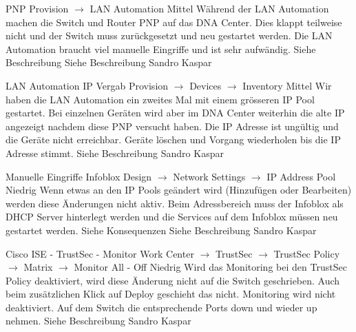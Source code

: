 \bugreport
{PNP}
{Provision $\rightarrow$ LAN Automation}
{Mittel}
{Während der LAN Automation machen die Switch und Router PNP auf das DNA Center. Dies klappt teilweise nicht und der Switch muss zurückgesetzt und neu gestartet werden.}
{Die LAN Automation braucht viel manuelle Eingriffe und ist sehr aufwändig.}
{Siehe Beschreibung}
{
	Siehe Beschreibung
}
{Sandro Kaspar}
{}


\bugreport
{LAN Automation IP Vergab}
{Provision $\rightarrow$ Devices $\rightarrow$ Inventory}
{Mittel}
{Wir haben die LAN Automation ein zweites Mal mit einem grösseren IP Pool gestartet. Bei einzelnen Geräten wird aber im DNA Center weiterhin die alte IP angezeigt nachdem diese PNP versucht haben.}
{Die IP Adresse ist ungültig und die Geräte nicht erreichbar.}
{Geräte löschen und Vorgang wiederholen bis die IP Adresse stimmt.}
{
	Siehe Beschreibung
}
{Sandro Kaspar}
{}

\bugreport
{Manuelle Eingriffe Infoblox}
{Design $\rightarrow$ Network Settings $\rightarrow$ IP Address Pool}
{Niedrig}
{Wenn etwas an den IP Pools geändert wird (Hinzufügen oder Bearbeiten) werden diese Änderungen nicht aktiv.}
{Beim Adressbereich muss der Infoblox als DHCP Server hinterlegt werden und die Services auf dem Infoblox müssen neu gestartet werden.}
{Siehe Konsequenzen}
{
	Siehe Beschreibung
}
{Sandro Kaspar}
{}

\bugreport
{Cisco ISE - TrustSec - Monitor}
{Work Center $\rightarrow$ TrustSec $\rightarrow$ TrustSec Policy $\rightarrow$ Matrix $\rightarrow$ Monitor All - Off}
{Niedrig}
{Wird das Monitoring bei den TrustSec Policy deaktiviert,  wird diese Änderung nicht auf die Switch geschrieben. Auch beim zusätzlichen Klick auf Deploy geschieht das nicht.}
{Monitoring wird nicht deaktiviert.}
{Auf dem Switch die entsprechende Ports down und wieder up nehmen.}
{
	Siehe Beschreibung
}
{Sandro Kaspar}
{}







